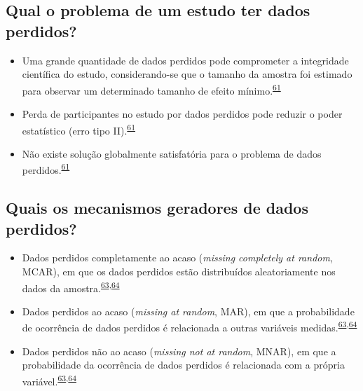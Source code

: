 \documentclass[
  a4paper,
]{book}
\begin{document}
\hypertarget{qual-o-problema-de-um-estudo-ter-dados-perdidos}{%
\subsection{Qual o problema de um estudo ter dados perdidos?}\label{qual-o-problema-de-um-estudo-ter-dados-perdidos}}

\begin{itemize}
\item
  Uma grande quantidade de dados perdidos pode comprometer a integridade científica do estudo, considerando-se que o tamanho da amostra foi estimado para observar um determinado tamanho de efeito mínimo.\textsuperscript{\protect\hyperlink{ref-Altman2007}{61}}
\item
  Perda de participantes no estudo por dados perdidos pode reduzir o poder estatístico (erro tipo II).\textsuperscript{\protect\hyperlink{ref-Altman2007}{61}}
\item
  Não existe solução globalmente satisfatória para o problema de dados perdidos.\textsuperscript{\protect\hyperlink{ref-Altman2007}{61}}
\end{itemize}

\hypertarget{quais-os-mecanismos-geradores-de-dados-perdidos}{%
\subsection{Quais os mecanismos geradores de dados perdidos?}\label{quais-os-mecanismos-geradores-de-dados-perdidos}}

\begin{itemize}
\item
  Dados perdidos completamente ao acaso (\emph{missing completely at random}, MCAR), em que os dados perdidos estão distribuídos aleatoriamente nos dados da amostra.\textsuperscript{\protect\hyperlink{ref-Heymans2022}{63},\protect\hyperlink{ref-carpenter2021}{64}}
\item
  Dados perdidos ao acaso (\emph{missing at random}, MAR), em que a probabilidade de ocorrência de dados perdidos é relacionada a outras variáveis medidas.\textsuperscript{\protect\hyperlink{ref-Heymans2022}{63},\protect\hyperlink{ref-carpenter2021}{64}}
\item
  Dados perdidos não ao acaso (\emph{missing not at random}, MNAR), em que a probabilidade da ocorrência de dados perdidos é relacionada com a própria variável.\textsuperscript{\protect\hyperlink{ref-Heymans2022}{63},\protect\hyperlink{ref-carpenter2021}{64}}
\end{itemize}
\end{document}
